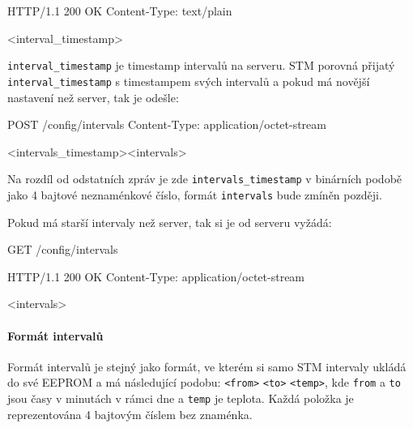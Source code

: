 \begin{packetserver}
HTTP/1.1 200 OK
Content-Type: text/plain

<interval_timestamp>
\end{packetserver}

\texttt{interval\_timestamp} je timestamp intervalů na serveru.
STM porovná přijatý \texttt{interval\_timestamp} s timestampem svých intervalů a pokud má novější nastavení
než server, tak je odešle:
\begin{packetstm}
POST /config/intervals
Content-Type: application/octet-stream

<intervals_timestamp><intervals>
\end{packetstm}

Na rozdíl od odstatních zpráv je zde \texttt{intervals\_timestamp} v binárních podobě jako 4 bajtové
neznaménkové číslo, formát \texttt{intervals} bude zmíněn později.

Pokud má starší intervaly než server, tak si je od serveru vyžádá:
\begin{packetstm}
GET /config/intervals
\end{packetstm}

\begin{packetserver}
HTTP/1.1 200 OK
Content-Type: application/octet-stream

<intervals>
\end{packetserver}

\paragraph{Formát intervalů}
Formát intervalů je stejný jako formát, ve kterém si samo STM intervaly ukládá do své EEPROM a
má následující podobu:
\texttt{<from>} \texttt{<to>} \texttt{<temp>}, kde \texttt{from} a \texttt{to} jsou
časy v minutách v rámci dne a \texttt{temp} je teplota.
Každá položka je reprezentována 4 bajtovým číslem bez znaménka.
